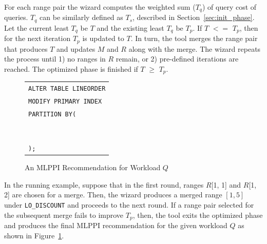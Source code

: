 \documentclass[runningheads]{comsis2}
\def\range#1{$[{#1}]$}
\begin{document}
For each range pair the wizard computes the weighted sum ($T_{q}$) of query cost of queries. 
$T_{q}$ can be similarly defined as $T_{s}$, described in Section~\ref{sec:init_phase}.
Let the current least $T_{q}$ be $T$ and the existing least $T_{q}$ be $T_{p}$. 
If $T$ $<=$ $T_{p}$, then for the next iteration $T_{p}$ is updated to $T$. 
In turn, the tool merges the range pair that produces $T$ and updates $M$ and $R$ along with the merge. 
The wizard repeats the process until 1) no ranges in $R$ remain, or 2) pre-defined iterations are reached. 
The optimized phase is finished if $T$ $\geq$ $T_{p}$.  

\begin{figure}[t]
\begin{center}
\begin{tabular}{|l|} \hline
{\tt ALTER TABLE LINEORDER} \\
{\tt MODIFY PRIMARY INDEX} \\
{\tt PARTITION BY(} \\
\hspace{.1in}{\tt CASE\_N(} \\
	\hspace{.2in}{\tt LO\_DISCOUNT $\geq$ 1 AND LO\_DISCOUNT $\leq$ 5,} \\
	\hspace{.2in}{\tt LO\_DISCOUNT $\geq$ 7,} \\ 
	\hspace{.2in}{\tt NO CASE OR UNKNOWN),} \\
\hspace{.1in}{\tt CASE\_N(} \\
	\hspace{.2in}{\tt LO\_QUANTITY $<$ 25,} \\
	\hspace{.2in}{\tt LO\_QUANTITY $\geq$ 25 AND LO\_QUANTITY $\leq$ 35,} \\
	\hspace{.2in}{\tt NO CASE OR UNKNOWN)} \\ 
{\tt );} \\ \hline
\end{tabular}
\end{center}
\caption{An MLPPI Recommendation for Workload $Q$\label{fig:mlppi}}
\end{figure}


In the running example, suppose that in the first round, ranges $R$[1, 1] and $R$[1, 2] are chosen for a merge. 
Then, the wizard produces a merged range \range{1, 5} \hbox{under} {\tt LO\_DISCOUNT} and proceeds to the next round. 
If a range pair selected for the subsequent merge fails to improve $T_{p}$, 
then, the tool exits the optimized phase and \hbox{produces} the final MLPPI recommendation for the given workload $Q$ 
as shown in Figure~\ref{fig:mlppi}. 
\end{document}
